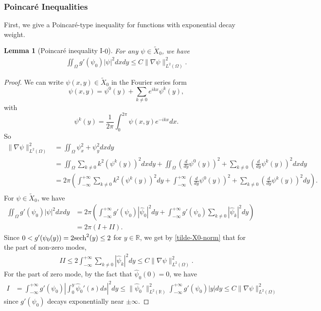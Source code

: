 \documentclass[1 [leqno, 11pt]{amsart}
\numberwithin{equation}{section}
\def\sech{{\rm{sech}}}
\newtheorem{lemma}[Theorem]{Lemma}
\begin{document}
\begin{CJK*}{GBK}{song}
\subsubsection{Poincar\'e Inequalities}
First, we give a Poincar\'e-type inequality for functions with exponential decay  weight.
\begin{lemma}[Poincar\'e inequality I-$0$]\label{poincare1}
For any $\psi \in \tilde{X}_0$, we have
\begin{align}\label{Poincare inequality I022}
\iint_\Omega g'(\psi_0)|\psi|^2 dxdy  \leq C \|\nabla \psi\|_{L^2(\Omega)}^2.
\end{align}
\end{lemma}
\begin{proof}
We can write $\psi(x, y) \in \tilde{X}_0$ in the Fourier series form
$$\psi(x,y) = \psi^0(y) + \sum_{k\neq 0}e^{ikx}\psi^k(y), $$
with $$\psi^k(y) = \frac{1}{2\pi}\int_{0}^{2\pi} \psi(x,y) e^{-ikx} dx.$$
So
\begin{align*}
\|\nabla \psi\|_{L^2(\Omega)}^2
& = \iint_\Omega \psi_x^2 + \psi_y^2 dxdy \\
& = \iint_\Omega \sum_{k\neq0} k^2 (\psi^k(y))^2 dxdy + \iint_\Omega (\frac{d}{dy} \psi^0(y))^2  +  \sum_{k\neq 0}(\frac{d}{dy} \psi^k(y))^2 dxdy\\
& =  2\pi \left( \int_{-\infty}^{+\infty} \sum_{k\neq0} k^2 (\psi^k(y))^2 dy + \int_{-\infty}^{+\infty} (\frac{d}{dy} \psi^0(y))^2  +  \sum_{k\neq 0}(\frac{d}{dy} \psi^k(y))^2 dy \right).\\
\end{align*}
\fi
For $\psi \in \tilde{X}_0$, we have
\begin{align*}
\iint_\Omega g'(\psi_0)|\psi|^2 dxdy
& = 2\pi\left( \int_{-\infty}^{+\infty} g'(\psi_0) \left|\widehat{\psi}_0\right|^2 dy  + \int_{-\infty}^{+\infty} g'(\psi_0) \sum_{k\neq 0}\left|\widehat{\psi}_k\right|^2 dy \right)\\
& = 2\pi (I + II).
\end{align*}
Since $0<g'(\psi_0(y)) = 2 \sech^2(y) \leq 2$ for $y\in\mathbb{R}$, we get by \eqref{tilde-X0-norm} that for the part of non-zero modes,
\begin{align*}
II \leq 2\int_{-\infty}^{+\infty} \sum_{k\neq 0}\left|\widehat{\psi}_k\right|^2 dy
\leq C \|\nabla \psi\|_{L^2(\Omega)}^2.
\end{align*}
For the  part of zero mode, by the fact that
$\widehat{\psi}_0(0)  = 0$, we have
\begin{align*}
I& = \int_{-\infty}^{+\infty} g'(\psi_0) \left|\int_0^y \widehat{\psi}_0'(s) ds\right|^2 dy
 \leq\|\widehat{\psi}_0'\|_{L^2(\mathbb{R})}^2 \int_{-\infty}^{+\infty} g'(\psi_0)|y| dy
\leq C\|\nabla \psi\|_{L^2(\Omega)}^2
\end{align*}
since $ g'(\psi_0)$ decays exponentially near $\pm\infty$.
\end{proof}



\end{CJK*}
\end{document}
